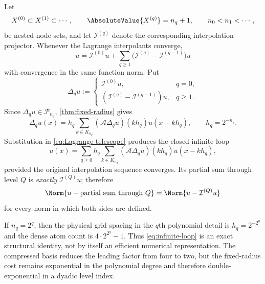 \documentclass[11pt,oneside]{article}
\numberwithin{equation}{section}
\theoremstyle{definition}
\theoremstyle{remark}
\newcommand{\PiN}{\mathcal P}
\newcommand{\App}{\mathscr A}
\newcommand{\Lag}{\mathcal I}
\begin{document}
Let
\begin{equation}
 X^{(0)}\subset X^{(1)}\subset\cdots,
 \qquad \AbsoluteValue{X^{(q)}}=n_q+1,
 \qquad n_0<n_1<\cdots,
 \label{eq:nested-nodes}
\end{equation}
be nested node sets, and let $\Lag^{(q)}$ denote the corresponding
interpolation projector.  Whenever the Lagrange interpolants converge,
\begin{equation}
 u=\Lag^{(0)}u+\sum_{q\ge1}
 \bigl(\Lag^{(q)}-\Lag^{(q-1)}\bigr)u
 \label{eq:Lagrange-telescope}
\end{equation}
with convergence in the same function norm.  Put
\begin{equation}
 \Delta_qu:=
 \begin{cases}
 \Lag^{(0)}u,&q=0,\\
 (\Lag^{(q)}-\Lag^{(q-1)})u,&q\ge1.
 \end{cases}
 \label{eq:detail-polynomials}
\end{equation}
Since $\Delta_qu\in\PiN_{n_q}$, \cref{thm:fixed-radius} gives
\begin{equation}
 \Delta_qu(x)=h_q\sum_{k\in K_{n_q}}
 (\App\Delta_qu)(kh_q)u(x-kh_q),
 \qquad h_q=2^{-n_q}.
 \label{eq:detail-up-series}
\end{equation}
Substitution in \eqref{eq:Lagrange-telescope} produces the closed infinite
loop
\begin{equation}
 u(x)=\sum_{q\ge0}h_q\sum_{k\in K_{n_q}}
 (\App\Delta_qu)(kh_q)u(x-kh_q),
 \label{eq:infinite-loop}
\end{equation}
provided the original interpolation sequence converges.  Its partial sum
through level $Q$ is \emph{exactly} $\Lag^{(Q)}u$; therefore
\begin{equation}
 \Norm{u-\text{partial sum through }Q}
 =\Norm{u-\Lag^{(Q)}u}
 \label{eq:exact-error-transfer}
\end{equation}
for every norm in which both sides are defined.

\begin{warning}
If $n_q=2^q$, then the physical grid spacing in the $q$th polynomial detail
is $h_q=2^{-2^q}$ and the dense atom count is
$4\cdot2^{2^q}-1$.  Thus \eqref{eq:infinite-loop} is an exact structural
identity, not by itself an efficient numerical representation.  The
compressed basis reduces the leading factor from four to two, but the
fixed-radius cost remains exponential in the polynomial degree and therefore
double-exponential in a dyadic level index.
\end{warning}
\end{document}

